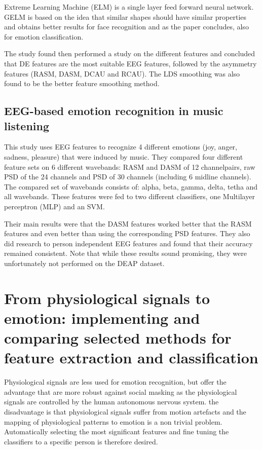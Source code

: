 \npar

Extreme Learning Machine (ELM)  is a single layer feed forward neural network\citep{ELMpaper}. GELM is based on the idea that similar shapes should have similar properties and obtains better results for face recognition\citep{GELMpaper} and as the paper concludes, also for emotion classification.

\npar

The study found then performed a study on the different features and concluded that DE features are the most suitable EEG features, followed by the asymmetry features (RASM, DASM, DCAU and RCAU). The LDS smoothing was also found to be the better feature smoothing method. 

\subsection{EEG-based emotion recognition in music listening}

This study\citep{emorecoghard} uses EEG features to recognize 4 different emotions (joy, anger, sadness, pleasure) that were induced by music. They compared four different feature sets on 6 different wavebands: RASM and DASM of 12 channelpairs, raw PSD of the 24 channels and PSD of 30 channels (including 6 midline channels). The compared set of wavebands consists of: alpha, beta, gamma, delta, tetha and all wavebands. These features were fed to two different classifiers, one Multilayer perceptron (MLP)  and an SVM. 

\npar

Their main results were that the DASM features worked better that the RASM features and even better than using the corresponding PSD features. They also did research to person independent EEG features and found that their accuracy remained consistent. Note that while these results sound promising, they were unfortunately not performed on the DEAP dataset.  

\section{From physiological signals to emotion: implementing and comparing selected methods for feature extraction and classification}

Physiological signals are less used for emotion recognition, but offer the advantage that are more robust against social masking as the physiological signals are controlled by the human autonomous nervous system\citep{PhytoEm}. the disadvantage is that physiological signals suffer from motion artefacts and the mapping of physiological patterns to emotion is a non trivial problem. Automatically selecting the most significant features and fine tuning the classifiers to a specific person is therefore desired.

